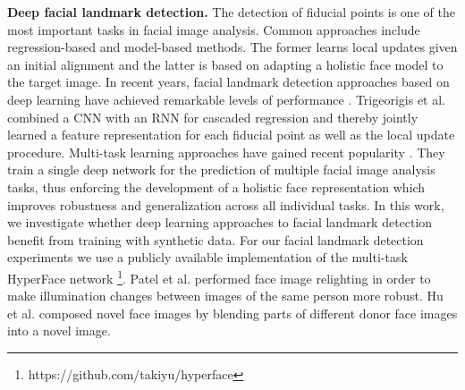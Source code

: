 \documentclass[10pt,twocolumn,letterpaper]{article}
\begin{document}
    \textbf{Deep facial landmark detection.} 
	The detection of fiducial  points is one of the most important tasks in facial image analysis. Common approaches include regression-based \cite{xiong2013supervised,cao2014face,kazemi2014one} and model-based \cite{cootes1995active,matthews2004active} methods. The former learns local updates given an initial alignment and the latter is based on adapting a holistic face model to the target image. In recent years, facial landmark detection approaches based on deep learning have achieved remarkable levels of performance \cite{sun2013deep}. Trigeorigis et al. \cite{trigeorgis2016mnemonic} combined a CNN with an RNN for cascaded regression and thereby jointly learned a feature representation for each fiducial point as well as the local update procedure. Multi-task learning approaches have gained recent popularity \cite{zhang2014facial,ranjan2017all}. They train a single deep network for the prediction of multiple facial image analysis tasks, thus enforcing the development of a holistic face representation which improves robustness and generalization across all individual tasks.	In this work, we investigate whether deep learning approaches to facial landmark detection benefit from training with synthetic data. For our facial landmark detection experiments we use a publicly available implementation of the multi-task HyperFace network \footnote{https://github.com/takiyu/hyperface}.
    Patel et al. \cite{patel2011illumination} performed face image relighting in order to make illumination changes between images of the same person more robust. Hu et al. \cite{hu2018frankenstein} composed novel face images by blending parts of different donor face images into a novel image.
\end{document}
